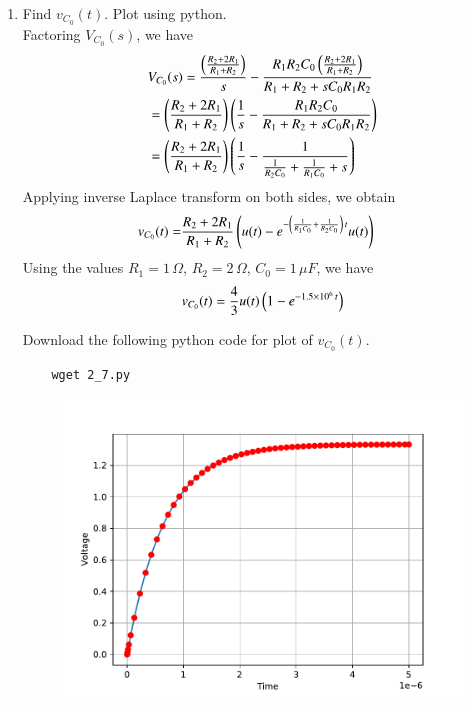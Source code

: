 \documentclass[journal,12pt,twocolumn]{IEEEtran}
\renewcommand\thesection{\arabic{section}}
\begin{document}
\begin{enumerate}[label=\arabic*.,ref=\thesection.\theenumi]
\item Find $v_{C_0}(t)$.  Plot using python. \\
\solution
Factoring $V_{C_0}(s)$, we have 
\begin{align}
    &V_{C_0}(s) = \frac{\left(\frac{R_2 + 2R_1}{R_1 + R_2}\right)}{s} - \frac{R_1 R_2 C_0 \left(\frac{R_2 + 2R_1}{R_1 + R_2}\right)}{R_1 + R_2 + sC_0 R_1 R_2} \\
    &= \left(\frac{R_2 + 2R_1}{R_1 + R_2}\right) \left(\frac{1}{s} - \frac{R_1 R_2 C_0}{R_1 + R_2 + sC_0 R_1 R_2}\right) \\
    &= \left(\frac{R_2 + 2R_1}{R_1 + R_2}\right) \left(\frac{1}{s} - \frac{1}{\frac{1}{R_2 C_0} + \frac{1}{R_1 C_0} + s}\right) 
\end{align}
Applying inverse Laplace transform on both sides, we obtain
\begin{align}
    v_{C_0}(t) = &\frac{R_2 + 2R_1}{R_1 + R_2} \left(u(t) - e^{-\left(\frac{1}{R_1 C_0} + \frac{1}{R_2 C_0}\right) \, t} u(t)\right)
\end{align}
Using the values $R_1 = 1 \, \Omega$, $R_2 = 2 \, \Omega$, $C_0 = 1 \, \mu F$, we have
\begin{align}
    v_{C_0}(t) = \frac{4}{3} u(t) \left(1 - e^{-1.5 \times 10^{6} \, t}\right) 
\end{align}

Download the following python code for plot of $v_{C_0}(t)$. 
\begin{lstlisting}
    wget 2_7.py
\end{lstlisting}

\begin{figure}[!ht]
    \centering
    \includegraphics[width=\columnwidth]{figs/2_7.pdf}
\end{figure}
\pagebreak


\end{enumerate}
\end{document}

